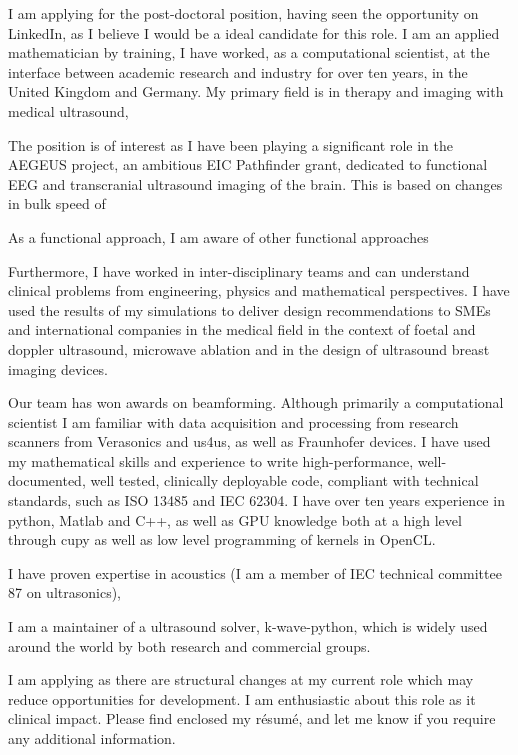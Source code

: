 \documentclass[10pt, a4paper, sans]{moderncv}
\begin{document}
%

%
\vfill %
%
I am applying for the post-doctoral position, having seen the opportunity on LinkedIn, as I believe I would be a ideal candidate for this role. 
%
\vfill
%
I am an applied mathematician by training, I have worked, as a computational scientist, at the interface between academic research and industry for over ten years, in the United Kingdom and Germany. My  primary field is in therapy and imaging with medical ultrasound,

The position is of interest as I have been playing a significant role in the AEGEUS project, an ambitious EIC Pathfinder grant, dedicated to functional EEG and transcranial ultrasound imaging of the brain. This is based on changes in bulk speed of 

As a functional approach, I am aware of other functional approaches

\vfill
%
Furthermore, I have worked in inter-disciplinary teams and can understand clinical problems from engineering, physics and mathematical perspectives. I have used the results of my simulations to deliver design recommendations to SMEs and international companies in the medical field in the context of foetal and doppler ultrasound, microwave ablation and in the design of ultrasound breast imaging devices. 

Our team has won awards on beamforming. 
%
Although primarily a computational scientist I am familiar with data acquisition and processing from research scanners from Verasonics and us4us, as well as Fraunhofer devices.   
%
\vfill
%
I have used my mathematical skills and experience to write high-performance, well-documented, well tested, clinically deployable code, compliant with technical standards, such as ISO 13485 and IEC 62304. I have over ten years experience in python, Matlab and C++, as well as GPU knowledge both at a high level through cupy as well as low level programming of kernels in OpenCL.

\vfill
%
I have proven expertise in acoustics (I am a member of IEC technical committee 87 on ultrasonics), 

I am a maintainer of a ultrasound solver, k-wave-python, which is widely used around the world by both research and commercial groups. 
%

%
\vfill
%
I am applying as there are structural changes at my current role which may reduce opportunities for development. I am enthusiastic about this role as it clinical impact.  
%
\vfill %
Please find enclosed my r\'{e}sum\'{e}, and let me know if you require any additional information.
%
\vfill
\makeletterclosing
\vfill
\end{document}
